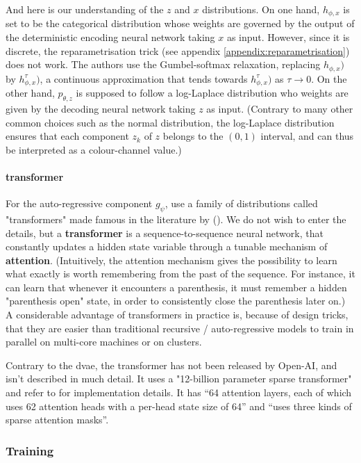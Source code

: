 \documentclass{article}
\begin{document}
\begin{multicols}{2}
And here is our understanding of the $z$ and $x$ distributions. On one hand, $h_{\phi,x}$ is set to be the categorical distribution whose weights are governed by the output of the deterministic encoding neural network taking $x$ as input. However, since it is discrete, the reparametrisation trick (see appendix \ref{appendix:reparametrisation}) does not work. The authors use the Gumbel-softmax relaxation, replacing $h_{\phi,x})$ by $h^\tau_{\phi,x})$, a continuous approximation that tends towards $h^\tau_{\phi,x})$ as $\tau \to 0$. On the other hand, $p_{\theta,z}$ is supposed to follow a log-Laplace distribution who weights are given by the decoding neural network taking $z$ as input. (Contrary to many other common choices such as the normal distribution, the log-Laplace distribution ensures that each component $z_k$ of $z$ belongs to the $(0,1)$ interval, and can thus be interpreted as a colour-channel value.)

\paragraph{\Gls{transformer}}

For the auto-regressive component $g_\psi$, \citeauthor{zeroshot} use a family of distributions called "transformers" made famous in the literature by  (\cite{attneed}). We do not wish to enter the details, but a \textbf{transformer} is a sequence-to-sequence neural network, that constantly updates a hidden state variable through a tunable mechanism of \textbf{attention}. (Intuitively, the attention mechanism gives the possibility to learn what exactly is worth remembering from the past of the sequence. For instance, it can learn that whenever it encounters a parenthesis, it must remember a hidden "parenthesis open" state, in order to consistently close the parenthesis later on.)
A considerable advantage of transformers in practice is, because of design tricks, that they are easier than traditional recursive / auto-regressive models to train in parallel on multi-core machines or on clusters.

Contrary to the \gls{dvae}, the transformer has not been released by Open-AI, and isn't described in much detail. It uses a "12-billion parameter sparse transformer" and refer to \cite{long-sequences} for implementation details.
It has \enquote{64 attention layers, each of which uses 62 attention heads with a per-head state size of 64} and \enquote{uses three kinds of sparse attention masks}.

\subsubsection{Training} \label{section:training}


\end{multicols}
\end{document}
